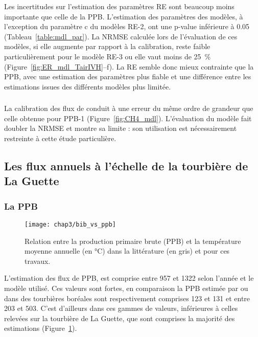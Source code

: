 Les incertitudes sur l'estimation des paramètres RE sont beaucoup moins importante que celle de la PPB.
L'estimation des paramètres des modèles, à l'exception du paramètre c du modèles RE-2, ont une p-value inférieure à 0.05 (Tableau~\ref{table:mdl_par}).
La NRMSE calculée lors de l'évaluation de ces modèles, si elle augmente par rapport à la calibration, reste faible particulièrement pour le modèle RE-3 ou elle vaut moins de \SI{25}{\percent} (Figure~\ref{fig:ER_mdl_TairIVH}--f).
La RE semble donc mieux contrainte que la PPB, avec une estimation des paramètres plus fiable et une différence entre les estimations issues des différents modèles plus limitée.

\subsubsection{\fchh}
La calibration des flux de \chh conduit à une erreur du même ordre de grandeur que celle obtenue pour PPB-1 (Figure~\ref{fig:CH4_mdl}). 
L'évaluation du modèle fait doubler la NRMSE et montre sa limite : son utilisation est nécessairement restreinte à cette étude particulière.


\subsection{Les flux annuels à l'échelle de la tourbière de La Guette}

\subsubsection{La PPB}

\begin{figure}
\centering
\texttt{[image: chap3/bib\_vs\_ppb]}
\caption{Relation entre la production primaire brute (PPB) et la température moyenne annuelle (en °C) dans la littérature (en gris) et pour ces travaux.}
\label{fig:bib_vs_ppb}
\end{figure}

L'estimation des flux de PPB, est comprise entre 957 et \SI{1322}{\gcma} selon l'année et le modèle utilisé.
Ces valeurs sont fortes, en comparaison la PPB estimée par  \citet{trudeau2014} ou \citet{peichl2014} dans des tourbières boréales sont respectivement comprises  123 et \SI{131}{\gcma} et entre 203 et \SI{503}{\gcma}.
C'est d'ailleurs dans ces gammes de valeurs, inférieures à celles relevées sur la tourbière de La Guette, que sont comprises la majorité des estimations (Figure~\ref{fig:bib_vs_ppb}).

